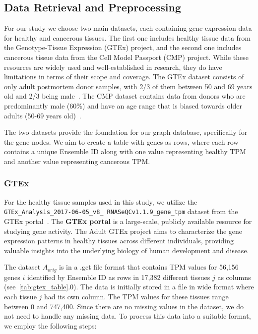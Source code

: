 \subsection{Data Retrieval and Preprocessing} \label{subsec:data}

For our study we choose two main datasets, each containing gene expression data for healthy and cancerous tissues.
The first one includes healthy tissue data from the Genotype-Tissue Expression (GTEx) project,
and the second one includes cancerous tissue data from the Cell Model Passport (CMP) project.
While these resources are widely used and well-established in research, they do have limitations in terms of their scope and coverage.
The GTEx dataset consists of only adult postmortem donor samples, with 2/3 of them between 50 and 69 years old and 2/3 being male~\cite{GTEX_modelannotation}.
The CMP dataset contains data from donors who are predominantly male (60\%)
and have an age range that is biased towards older adults (50-69 years old)~\cite{CMP_modelannotation}.

The two datasets provide the foundation for our graph database, specifically for the gene nodes.
We aim to create a table with genes as rows,
where each row contains a unique Ensemble ID along with one value representing healthy TPM and another value representing cancerous TPM.
\\


\subsubsection*{GTEx} \label{subsubsec:GTEx}
For the healthy tissue samples used in this study,
we utilize the \texttt{GTEx\_Analysis\_2017-06-05\_v8\_\newline
RNASeQCv1.1.9\_gene\_tpm} dataset from the GTEx portal~\cite{gtex_download}.
The \textbf{GTEx portal} is a large-scale, publicly available resource for studying gene activity.
The Adult GTEx project aims to characterize the gene expression patterns in healthy tissues across different individuals,
providing valuable insights into the underlying biology of human development and disease.

The dataset $A_{orig}$ is in a .gct file format that contains TPM values for 56,156 genes $i$ identified by
Ensemble ID as rows in 17,382 different tissues $j$ as columns (see~\cref{tab:gtex_table}.0).
The data is initially stored in a file in wide format where each tissue $j$ had its own column.
The TPM values for these tissues range between 0 and 747,400.
Since there are no missing values in the dataset, we do not need to handle any missing data.
To process this data into a suitable format, we employ the following steps:

